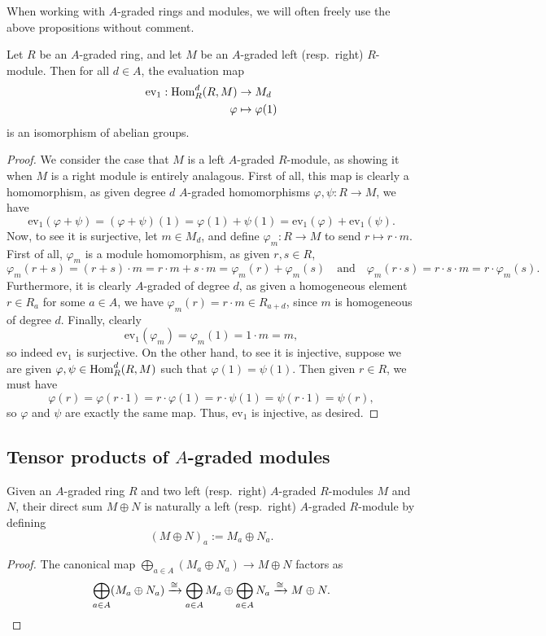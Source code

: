 \documentclass[../main.tex]{subfiles}
\begin{document}
When working with $A$-graded rings and modules, we will often freely use the above propositions without comment. 

\begin{lemma}\label{ev_at_1_is_iso}
	Let $R$ be an $A$-graded ring, and let $M$ be an $A$-graded left (resp.\ right) $R$-module. Then for all $d\in A$, the evaluation map
	\begin{align*}
		\mathrm{ev_1}:\mathrm{Hom}_{R}^d(R,M)&\to M_d \\
		\varphi&\mapsto\varphi(1)
	\end{align*}
	is an isomorphism of abelian groups.
\end{lemma}
\begin{proof}
	We consider the case that $M$ is a left $A$-graded $R$-module, as showing it when $M$ is a right module is entirely analagous. First of all, this map is clearly a homomorphism, as given degree $d$ $A$-graded homomorphisms $\varphi,\psi:R\to M$, we have 
	\[\mathrm{ev}_1(\varphi+\psi)=(\varphi+\psi)(1)=\varphi(1)+\psi(1)=\mathrm{ev}_1(\varphi)+\mathrm{ev}_1(\psi).\]
	Now, to see it is surjective, let $m\in M_d$, and define $\varphi_m:R\to M$ to send $r\mapsto r\cdot m$. First of all, $\varphi_m$ is a module homomorphism, as given $r,s\in R$, 
	\[\varphi_m(r+s)=(r+s)\cdot m=r\cdot m+s\cdot m=\varphi_m(r)+\varphi_m(s)\quad\text{and}\quad\varphi_m(r\cdot s)=r\cdot s\cdot m=r\cdot\varphi_m(s).\]
	Furthermore, it is clearly $A$-graded of degree $d$, as given a homogeneous element $r\in R_a$ for some $a\in A$, we have $\varphi_m(r)=r\cdot m\in R_{a+d}$, since $m$ is homogeneous of degree $d$. Finally, clearly 
	\[\mathrm{ev}_1(\varphi_m)=\varphi_m(1)=1\cdot m=m,\]
	so indeed $\mathrm{ev}_1$ is surjective. On the other hand, to see it is injective, suppose we are given $\varphi,\psi\in\mathrm{Hom}_R^d(R,M)$ such that $\varphi(1)=\psi(1)$. Then given $r\in R$, we must have
	\[\varphi(r)=\varphi(r\cdot 1)=r\cdot\varphi(1)=r\cdot\psi(1)=\psi(r\cdot 1)=\psi(r),\]
	so $\varphi$ and $\psi$ are exactly the same map. Thus, $\mathrm{ev}_1$ is injective, as desired.
\end{proof}

\subsection{Tensor products of \texorpdfstring{$A$}{A}-graded modules}

\begin{lemma}\label{product_of_A_graded}
	Given an $A$-graded ring $R$ and two left (resp.\ right) $A$-graded $R$-modules $M$ and $N$, their direct sum $M\oplus N$ is naturally a left (resp.\ right) $A$-graded $R$-module by defining
	\[(M\oplus N)_a:=M_a\oplus N_a.\]
\end{lemma}
\begin{proof}
	The canonical map $\bigoplus_{a\in A}(M_a\oplus N_a)\to M\oplus N$ factors as
	\[\bigoplus_{a\in A}(M_a\oplus N_a)\xrightarrow\cong\bigoplus_{a\in A}M_a\oplus\bigoplus_{a\in A}N_a\xrightarrow\cong M\oplus N.\qedhere\]
\end{proof}
\end{document}
